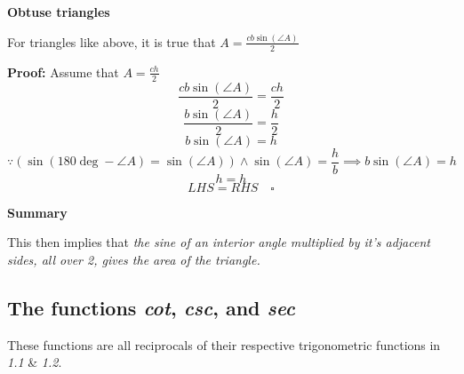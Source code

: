 \documentclass[a4paper, 12pt]{article}
\begin{document}
\begin{center}
	{\large \textbf{Obtuse triangles} } \bigbreak


\end{center}
For triangles like above, it is true that {\Large $A = \frac{cb\sin(\angle{A})}{2}$}

\begin{center}
	\textbf{Proof:} \bigbreak
	Assume that $A = \frac{ch}{2}$ \\
	$$\frac{cb\sin(\angle{A})}{2} = \frac{ch}{2}$$
	$$\frac{b\sin(\angle{A})}{2} = \frac{h}{2}$$
	$$b\sin(\angle{A}) = h$$
	$$\because (\sin(180\deg - \angle{A}) = \sin(\angle{A})) \land \sin(\angle{A}) = \frac{h}{b} \implies b\sin(\angle{A}) = h$$
	$$h = h$$
	$$LHS = RHS \quad \square$$
\end{center}
\newpage



{\large \textbf{Summary}} \bigbreak

This then implies that \emph{the sine of an interior angle multiplied by it's adjacent sides, all over 2, gives the area of the triangle.}

\subsection{The functions \emph{cot}, \emph{csc}, and \emph{sec}}
These functions are all reciprocals of their respective trigonometric functions in \emph{1.1} \& \emph{1.2}.
\end{document}
